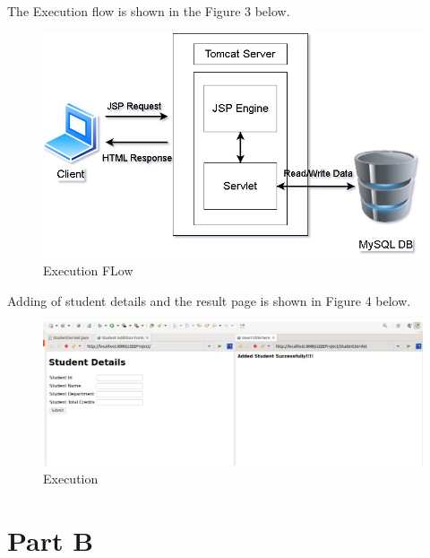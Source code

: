 \documentclass{article}
\begin{document}
The Execution flow is shown in the Figure 3 below.
\begin{figure}[!ht]
  \begin{center}
    \includegraphics[scale=0.5]{flow.jpg}
  \caption{Execution FLow}
  \end{center}
\end{figure}

\newpage
Adding of student details and the result page is shown in Figure 4 below.
\begin{figure}[!ht]
  \begin{center}
    \includegraphics[scale=0.5]{A_3.jpg}
  \caption{Execution}
  \end{center}
\end{figure}


\newpage
\section{Part B}
\end{document}
